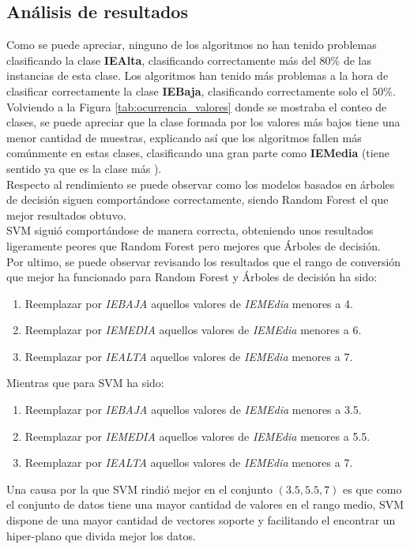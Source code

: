 \subsection{Análisis de resultados}
Como se puede apreciar, ninguno de los algoritmos no han tenido problemas clasificando la clase \textbf{IEAlta}, clasificando correctamente más del $80\%$ de las instancias de esta clase.
Los algoritmos han tenido más problemas a la hora de clasificar correctamente la clase \textbf{IEBaja}, clasificando correctamente solo el $50\%$. Volviendo a la Figura \ref{tab:ocurrencia_valores} donde se mostraba el conteo de clases, se puede apreciar que la clase formada por los valores más bajos tiene una menor cantidad de muestras, explicando así que los algoritmos fallen más comúnmente en estas clases, clasificando una gran parte como \textbf{IEMedia} (tiene sentido ya que es la clase más ).\\
\linebreak
Respecto al rendimiento se puede observar como los modelos basados en árboles de decisión siguen comportándose correctamente, siendo Random Forest el que mejor resultados obtuvo. \\
SVM siguió comportándose de manera correcta, obteniendo unos resultados ligeramente peores que Random Forest pero mejores que Árboles de decisión.\\
\linebreak
Por ultimo, se puede observar revisando los resultados que el rango de conversión que mejor ha funcionado para Random Forest y Árboles de decisión ha sido:
\begin{enumerate}
	\item Reemplazar por \textit{IEBAJA} aquellos valores de \textit{IEMEdia} menores a 4.
	\item Reemplazar por \textit{IEMEDIA} aquellos valores de \textit{IEMEdia} menores a 6.
	\item Reemplazar por \textit{IEALTA} aquellos valores de \textit{IEMEdia} menores a 7.
\end{enumerate}
Mientras que para SVM ha sido:
\begin{enumerate}
	\item Reemplazar por \textit{IEBAJA} aquellos valores de \textit{IEMEdia} menores a 3.5.
	\item Reemplazar por \textit{IEMEDIA} aquellos valores de \textit{IEMEdia} menores a 5.5.
	\item Reemplazar por \textit{IEALTA} aquellos valores de \textit{IEMEdia} menores a 7.
\end{enumerate}
Una causa por la que  SVM rindió mejor en el conjunto $(3.5,5.5,7)$ es que como el conjunto de datos tiene una mayor cantidad de valores en el rango medio, SVM dispone de una mayor cantidad de vectores soporte y facilitando el encontrar un hiper-plano que divida mejor los datos.
\clearpage
